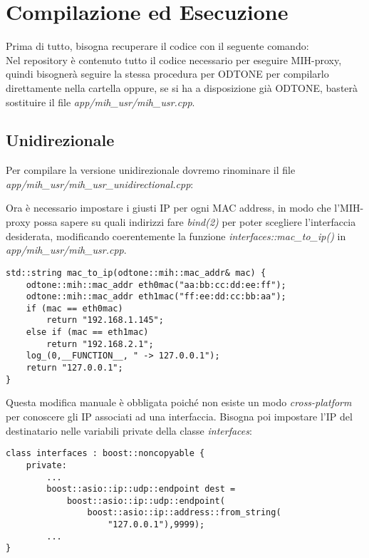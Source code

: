 \section{Compilazione ed Esecuzione}
Prima di tutto, bisogna recuperare il codice con il seguente comando:\\
Nel repository è contenuto tutto il codice necessario per eseguire MIH-proxy, quindi bisognerà seguire la stessa procedura per ODTONE per compilarlo direttamente nella cartella oppure, se si ha a disposizione già ODTONE, basterà sostituire il file {\em app/mih\_usr/mih\_usr.cpp}.

\subsection{Unidirezionale}
Per compilare la versione unidirezionale dovremo rinominare il file \\{\em app/mih\_usr/mih\_usr\_unidirectional.cpp}:\\

Ora è necessario impostare i giusti IP per ogni MAC address, in modo che l'MIH-proxy possa sapere su quali indirizzi fare {\em bind(2)} per poter scegliere l'interfaccia desiderata, modificando coerentemente la funzione {\em interfaces::mac\_to\_ip()} in {\em app/mih\_usr/mih\_usr.cpp}.

\begin{verbatim}
std::string mac_to_ip(odtone::mih::mac_addr& mac) {
    odtone::mih::mac_addr eth0mac("aa:bb:cc:dd:ee:ff");
    odtone::mih::mac_addr eth1mac("ff:ee:dd:cc:bb:aa");
    if (mac == eth0mac)
        return "192.168.1.145";
    else if (mac == eth1mac)
        return "192.168.2.1";
    log_(0,__FUNCTION__, " -> 127.0.0.1");
    return "127.0.0.1";
}

\end{verbatim}

Questa modifica manuale è obbligata poiché non esiste un modo {\em cross-platform} per conoscere gli IP associati ad una interfaccia. Bisogna poi impostare l'IP del destinatario nelle variabili private della classe {\em interfaces}:

\begin{verbatim}
class interfaces : boost::noncopyable {
    private:
        ...
        boost::asio::ip::udp::endpoint dest = 
            boost::asio::ip::udp::endpoint(
                boost::asio::ip::address::from_string(
                    "127.0.0.1"),9999);
        ...
}
\end{verbatim}

